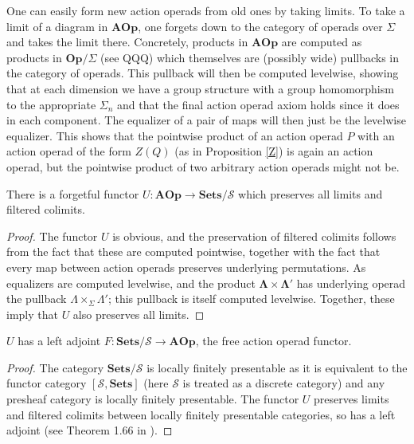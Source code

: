 \documentclass{amsbook} %
\newcommand{\mb}{\mathbf}
\renewcommand{\SS}{\mathcal{S}}
\numberwithin{section}{chapter}
\begin{document}
\begin{example}
One can easily form new action operads from old ones by taking limits.  To take a limit of a diagram in $\mb{AOp}$, one forgets down to the category of operads over $\Sigma$ and takes the limit there.  Concretely, products in $\mb{AOp}$ are computed as products in $\mb{Op}/\Sigma$ (see QQQ) which themselves are (possibly wide) pullbacks in the category of operads.  This pullback will then be computed levelwise, showing that at each dimension we have a group structure with a group homomorphism to the appropriate $\Sigma_{n}$ and that the final action operad axiom holds since it does in each component.  The equalizer of a pair of maps will then just be the levelwise equalizer.  This shows that the pointwise product of an action operad $P$ with an action operad of the form $Z(Q)$ (as in Proposition \ref{Z}) is again an action operad, but the pointwise product of two arbitrary action operads might not be.
\end{example}
\begin{thm}\label{underlyingSS}
There is a forgetful functor $U \colon \mb{AOp} \rightarrow \mb{Sets}/\SS$ which preserves all limits and filtered colimits.
\end{thm}

\begin{proof}
The functor $U$ is obvious, and the preservation of filtered colimits follows from the fact that these are computed pointwise, together with the fact that every map between action operads preserves underlying permutations.
As equalizers are computed levelwise, and the product $\mb{\Lambda} \times \mb{\Lambda}'$ has underlying operad the pullback $\Lambda \times_{\Sigma} \Lambda'$; this pullback is itself computed levelwise.  Together, these imply that $U$ also preserves all limits.
\end{proof}

\begin{cor}
$U$ has a left adjoint $F \colon \mb{Sets}/\SS \rightarrow \mb{AOp}$, the free action operad functor.
\end{cor}
\begin{proof}
The category $\mb{Sets}/\SS$ is locally finitely presentable as it is equivalent to the functor category $[\SS, \mb{Sets}]$ (here $\SS$ is treated as a discrete category) and any presheaf category is locally finitely presentable.  The functor $U$ preserves limits and filtered colimits between locally finitely presentable categories, so has a left adjoint (see Theorem 1.66 in \cite{ar}).
\end{proof}
\end{document}
